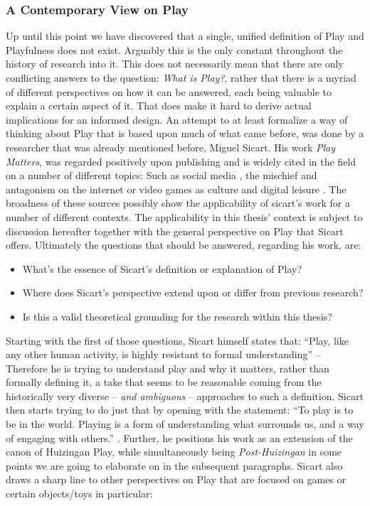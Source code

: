 \subsubsection{A Contemporary View on Play}

Up until this point we have discovered that a single, unified definition of Play and Playfulness does not exist. Arguably this is the only constant throughout the history of research into it. This does not necessarily mean that there are only conflicting answers to the question: \textit{What is Play?}, rather that there is a myriad of different perspectives on how it can be answered, each being valuable to explain a certain aspect of it. That does make it hard to derive actual implications for an informed design. An attempt to at least formalize a way of thinking about Play that is based upon much of what came before, was done by a researcher that was already mentioned before, Miguel Sicart. His work \textit{Play Matters}, was regarded positively upon publishing and is widely cited in the field on a number of different topics: Such as social media \cite{hjorth2019understanding}, the mischief and antagonism on the internet \cite{phillips2018ambivalent} or video games as culture \cite{daniel2018video} and digital leisure \cite{spracklen2015digital}. The broadness of these sources possibly show the applicability of sicart's work for a number of different contexts. The applicability in this thesis' context is subject to discussion hereafter together with the general perspective on Play that Sicart offers. Ultimately the questions that should be answered, regarding his work, are:

\begin{itemize}
  \item{What's the essence of Sicart's definition or explanation of Play?}
  \item{Where does Sicart's perspective extend upon or differ from previous research?}
  \item{Is this a valid theoretical grounding for the research within this thesis?}
\end{itemize}

Starting with the first of those questions, Sicart himself states that: \enquote{Play, like any other human activity, is highly resistant to formal understanding} \cite[p. 2]{sicart2014play} -- Therefore he is trying to understand play and why it matters, rather than formally defining it, a take that seems to be reasonable coming from the historically very diverse -- \textit{and ambiguous} -- approaches to such a definition. Sicart then starts trying to do just that by opening with the statement: \enquote{To play is to be in the world. Playing is a form of understanding what surrounds us, and a way of engaging with others.} \cite[p. 1]{sicart2014play}. Further, he positions his work as an extension of the canon of Huizingan Play, while simultaneously being \textit{Post-Huizingan} in some points we are going to elaborate on in the subsequent paragraphs. Sicart also draws a sharp line to other perspectives on Play that are focused on games or certain objects/toys in particular:

